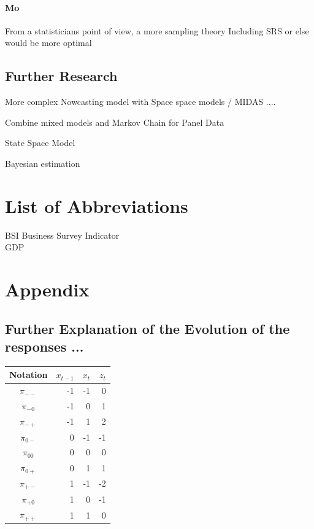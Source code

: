 \documentclass[12pt,a4paper,oneside]{book}
\begin{document}
\subsubsection*{Mo}
From a statisticians point of view, a more sampling theory Including SRS or else would be more optimal

\section*{Further Research}



More complex Nowcasting model with Space space models / MIDAS ....

Combine mixed models and Markov Chain for Panel Data \citep{de_haan-rietdijk_use_2017} 

State Space Model

Bayesian estimation \cite{bialowolski_bayesian_nodate}

\nocite{hlavac_stargazer:_2018}


 

\chapter*{List of Abbreviations}
  BSI Business Survey Indicator \\
  GDP   \\
  
\begin{appendix}
  \listoffigures
  \listoftables
\end{appendix}


\chapter*{Appendix}

\section*{Further Explanation of the Evolution of the responses ...}
\begin{center}
\begin{tabular}{|c|r|r|r|}
Notation    &  $x_{t-1}$ & $x_t$ & $z_t$ \\\hline
$\pi_{--}$    &  -1  & -1    & 0 \\
$\pi_{-0}$    &  -1  & 0     & 1 \\
$\pi_{-+}$    &  -1  & 1     & 2 \\
$\pi_{0-}$    &  0   & -1    & -1 \\
$\pi_{00}$    &  0   & 0     & 0 \\
$\pi_{0+}$    &  0   & 1     & 1 \\
$\pi_{+-}$    &  1   & -1    & -2 \\
$\pi_{+0}$    &  1   & 0     & -1 \\
$\pi_{++}$    &  1   & 1     & 0 \\
\end{tabular}  
\end{center}
\end{document}
